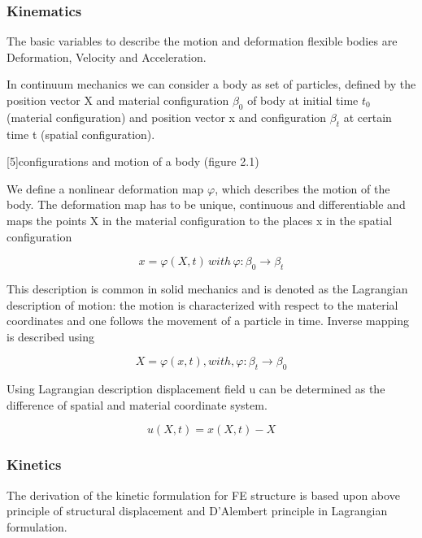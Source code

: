 \subsubsection{Kinematics \cite{FEM}}

The basic variables to describe the motion and deformation flexible
bodies are Deformation, Velocity and Acceleration. 

In continuum mechanics we can consider a body as set of particles,
defined by the position vector X and material configuration $\beta_{0}$
of body at initial time $t_{0}$ (material configuration)
and position vector x and configuration $\beta_{t}$
at certain time t (spatial configuration).

{[}5{]}configurations and motion of a body (figure 2.1)

We define a nonlinear deformation map $\varphi$, which describes
the motion of the body. The deformation map has to be unique, continuous
and differentiable and maps the points X in the material configuration
to the places x in the spatial configuration 

\begin{equation}
x=\varphi(X,t)\,with\,\varphi\colon\beta_{0}\rightarrow\beta_{t}
\end{equation}


This description is common in solid mechanics and is denoted as the
Lagrangian description of motion: the motion is characterized with
respect to the material coordinates and one follows the movement of
a particle in time. Inverse mapping is described using 

\begin{equation}
X=\varphi(x,t) , with, \varphi: \beta_{t}\rightarrow\beta_{0}
\end{equation}


Using Lagrangian description displacement field u can be determined
as the difference of spatial and material coordinate system.

\begin{equation}
u(X,t)=x(X,t)-X\label{Lagrangian displacement field}
\end{equation}







\subsubsection{Kinetics \cite{FEM}}

The derivation of the kinetic formulation for FE structure is based
upon above principle of structural displacement and D\textquoteright Alembert
principle in Lagrangian formulation.

